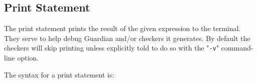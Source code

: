 
\subsection{Print Statement}
{
	The print statement prints the result of the given expression to
	the terminal. They serve to help debug Guardian and/or checkers it
	generates. By default the checkers will skip printing unless explicitly
	told to do so with the "\texttt{-v}" command-line option.
	
	The syntax for a print statement is:
	\begin{lstlisting}[texcl = true, language = MAIA]
%print: <expression>;
	\end{lstlisting}
}
